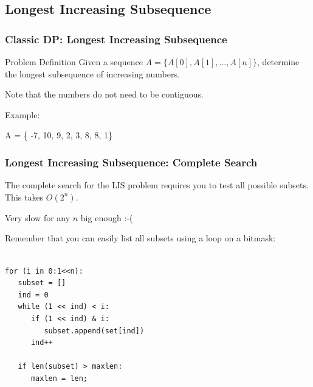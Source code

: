 \documentclass{beamer}
\begin{document}
\subsection{Longest Increasing Subsequence}

\begin{frame}
  \frametitle{Classic DP: Longest Increasing Subsequence}
  \begin{block}{Problem Definition}
    Given a sequence $A = \{A[0],A[1],\ldots,A[n]\}$, determine the 
    longest subsequence of increasing numbers.

    \smallskip

    Note that the numbers do not need to be contiguous.
  \end{block}

  Example:

  \bigskip

  A = \{ \alert{-7}, 10, 9, \alert{2}, \alert{3}, \alert{8}, 8, 1\}
\end{frame}

\begin{frame}[fragile]
  \frametitle{Longest Increasing Subsequence: Complete Search}

  The complete search for the LIS problem requires you to test 
  all possible subsets. This takes $O(2^n)$. 

  \bigskip

  Very slow for any $n$ big enough :-(

  {\small
  \begin{block}{}
    Remember that you can easily list all subsets using a loop on a bitmask:
    {\smaller
\begin{verbatim}

for (i in 0:1<<n):
   subset = []
   ind = 0
   while (1 << ind) < i:
      if (1 << ind) & i:
         subset.append(set[ind])
      ind++

   if len(subset) > maxlen:
      maxlen = len;
\end{verbatim}
    }
  \end{block}}
\end{frame}
\end{document}

